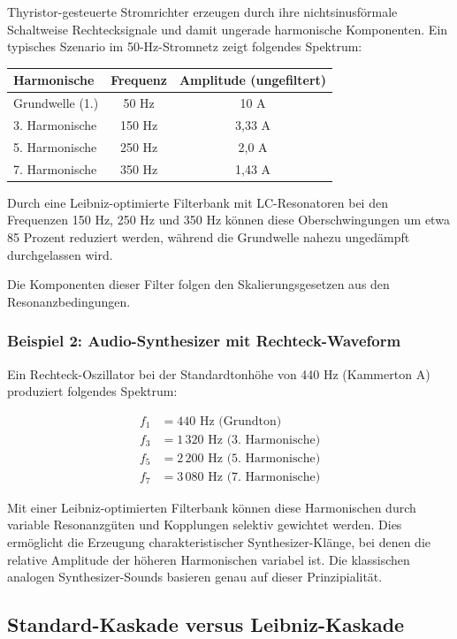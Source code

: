 \documentclass[a4paper,12pt,twoside]{report}
\theoremstyle{definition}
\begin{document}
Thyristor-gesteuerte Stromrichter erzeugen durch ihre nichtsinusförmale Schaltweise Rechtecksignale und damit ungerade harmonische Komponenten. Ein typisches Szenario im 50-Hz-Stromnetz zeigt folgendes Spektrum:

\begin{center}
\begin{tabular}{l|c|c}
Harmonische & Frequenz & Amplitude (ungefiltert) \\
\hline
Grundwelle (1.) & 50 Hz & 10 A \\
3. Harmonische & 150 Hz & 3,33 A \\
5. Harmonische & 250 Hz & 2,0 A \\
7. Harmonische & 350 Hz & 1,43 A
\end{tabular}
\end{center}

Durch eine Leibniz-optimierte Filterbank mit LC-Resonatoren bei den Frequenzen 150 Hz, 250 Hz und 350 Hz können diese Oberschwingungen um etwa 85 Prozent reduziert werden, während die Grundwelle nahezu ungedämpft durchgelassen wird.

Die Komponenten dieser Filter folgen den Skalierungsgesetzen aus den Resonanzbedingungen.

\subsubsection*{Beispiel 2: Audio-Synthesizer mit Rechteck-Waveform}

Ein Rechteck-Oszillator bei der Standardtonhöhe von 440 Hz (Kammerton A) produziert folgendes Spektrum:

\begin{align}
	f_1 &= 440 \text{ Hz (Grundton)} \\
	f_3 &= 1\,320 \text{ Hz (3. Harmonische)} \\
	f_5 &= 2\,200 \text{ Hz (5. Harmonische)} \\
	f_7 &= 3\,080 \text{ Hz (7. Harmonische)}
\end{align}

Mit einer Leibniz-optimierten Filterbank können diese Harmonischen durch variable Resonanzgüten und Kopplungen selektiv gewichtet werden. Dies ermöglicht die Erzeugung charakteristischer Synthesizer-Klänge, bei denen die relative Amplitude der höheren Harmonischen variabel ist. Die klassischen analogen Synthesizer-Sounds basieren genau auf dieser Prinzipialität.

\subsection{Standard-Kaskade versus Leibniz-Kaskade}
\end{document}
